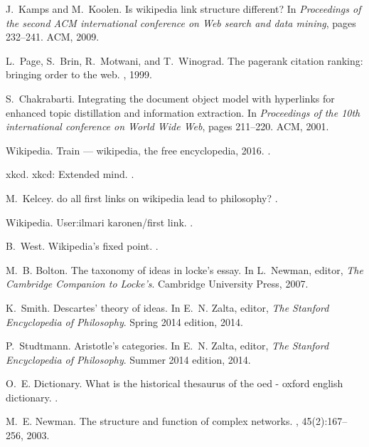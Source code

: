 \documentclass[pre,twocolumn,twoside,superscriptaddress,floatfix]{revtex4-1}
\begin{document}
{\begin{thebibliography}{10}
J.~Kamps and M.~Koolen.
\newblock Is wikipedia link structure different?
\newblock In {\em Proceedings of the second ACM international conference on Web
  search and data mining}, pages 232--241. ACM, 2009.

L.~Page, S.~Brin, R.~Motwani, and T.~Winograd.
\newblock The pagerank citation ranking: bringing order to the web.
, 1999.

S.~Chakrabarti.
\newblock Integrating the document object model with hyperlinks for enhanced
  topic distillation and information extraction.
\newblock In {\em Proceedings of the 10th international conference on World
  Wide Web}, pages 211--220. ACM, 2001.

Wikipedia.
\newblock Train --- wikipedia{,} the free encyclopedia, 2016.
.

xkcd.
\newblock xkcd: Extended mind.
.

M.~Kelcey.
\newblock do all first links on wikipedia lead to philosophy?
.

Wikipedia.
\newblock User:ilmari karonen/first link.
.

B.~West.
\newblock Wikipedia's fixed point.
.

M.~B. Bolton.
\newblock The taxonomy of ideas in locke's essay.
\newblock In L.~Newman, editor, {\em The Cambridge Companion to Locke's}.
  Cambridge University Press, 2007.

K.~Smith.
\newblock Descartes' theory of ideas.
\newblock In E.~N. Zalta, editor, {\em The Stanford Encyclopedia of
  Philosophy}. Spring 2014 edition, 2014.

P.~Studtmann.
\newblock Aristotle's categories.
\newblock In E.~N. Zalta, editor, {\em The Stanford Encyclopedia of
  Philosophy}. Summer 2014 edition, 2014.

O.~E. Dictionary.
\newblock What is the historical thesaurus of the oed - oxford english
  dictionary.
.

M.~E. Newman.
\newblock The structure and function of complex networks.
, 45(2):167--256, 2003.


\end{thebibliography}}
\end{document}
